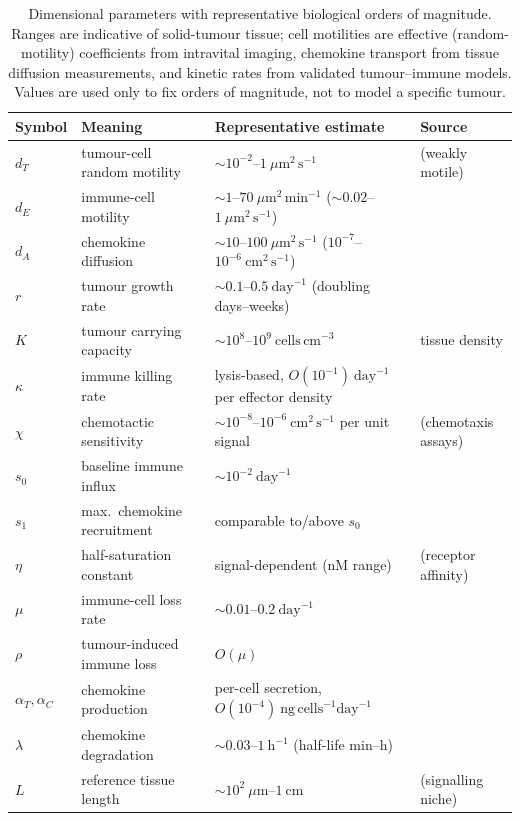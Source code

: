 \documentclass[a4paper,fleqn,longmktitle]{cas-sc}
\theoremstyle{plain}
\theoremstyle{definition}
\numberwithin{equation}{section}
\begin{document}
\begin{table}[htbp]
\centering
\caption{Dimensional parameters with representative biological orders of
magnitude. Ranges are indicative of solid-tumour tissue; cell motilities are
effective (random-motility) coefficients from intravital imaging, chemokine
transport from tissue diffusion measurements, and kinetic rates from validated
tumour--immune models. Values are used only to fix orders of magnitude, not to
model a specific tumour.}
\label{tab:dimensional-parameters}
\begin{tabularx}{\textwidth}{@{} l >{\raggedright\arraybackslash}X >{\raggedright\arraybackslash}X l @{}}
\toprule
Symbol & Meaning & Representative estimate & Source \\
\midrule
$d_T$ & tumour-cell random motility & $\sim 10^{-2}$--$1\ \mu\mathrm{m}^2\,\mathrm{s}^{-1}$ & (weakly motile) \\
$d_E$ & immune-cell motility        & $\sim 1$--$70\ \mu\mathrm{m}^2\,\mathrm{min}^{-1}$ ($\sim0.02$--$1\ \mu\mathrm{m}^2\,\mathrm{s}^{-1}$) & \cite{miller2003autonomous} \\
$d_A$ & chemokine diffusion         & $\sim 10$--$100\ \mu\mathrm{m}^2\,\mathrm{s}^{-1}$ ($10^{-7}$--$10^{-6}\ \mathrm{cm}^2\,\mathrm{s}^{-1}$) & \cite{thurley2015three} \\
$r$   & tumour growth rate          & $\sim 0.1$--$0.5\ \mathrm{day}^{-1}$ (doubling days--weeks) & \cite{de2005validated} \\
$K$   & tumour carrying capacity    & $\sim 10^{8}$--$10^{9}\ \mathrm{cells\,cm}^{-3}$ & tissue density \\
$\kappa$ & immune killing rate      & lysis-based, $O(10^{-1})\ \mathrm{day}^{-1}$ per effector density & \cite{de2005validated} \\
$\chi$ & chemotactic sensitivity    & $\sim 10^{-8}$--$10^{-6}\ \mathrm{cm}^2\,\mathrm{s}^{-1}$ per unit signal & (chemotaxis assays) \\
$s_0$ & baseline immune influx      & $\sim 10^{-2}\ \mathrm{day}^{-1}$ & \cite{de2005validated} \\
$s_1$ & max.\ chemokine recruitment & comparable to/above $s_0$ & \cite{de2005validated} \\
$\eta$ & half-saturation constant   & signal-dependent (nM range) & (receptor affinity) \\
$\mu$ & immune-cell loss rate       & $\sim 0.01$--$0.2\ \mathrm{day}^{-1}$ & \cite{de2005validated} \\
$\rho$ & tumour-induced immune loss  & $O(\mu)$ & \cite{de2005validated} \\
$\alpha_T,\alpha_C$ & chemokine production & per-cell secretion, $O(10^{-4})\ \mathrm{ng}\,\mathrm{cells}^{-1}\mathrm{day}^{-1}$ & \cite{poznansky2000active,sutherland1990functional} \\
$\lambda$ & chemokine degradation   & $\sim 0.03$--$1\ \mathrm{h}^{-1}$ (half-life min--h) & \cite{thurley2015three} \\
$L$ & reference tissue length       & $\sim 10^{2}\ \mu\mathrm{m}$--$1\ \mathrm{cm}$ & (signalling niche) \\
\bottomrule
\end{tabularx}
\end{table}
\end{document}
